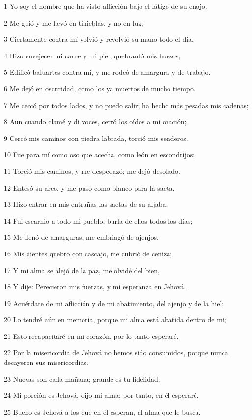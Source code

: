 \par 1 Yo soy el hombre que ha visto aflicción bajo el látigo de su enojo.
\par 2 Me guió y me llevó en tinieblas, y no en luz;
\par 3 Ciertamente contra mí volvió y revolvió su mano todo el día.
\par 4 Hizo envejecer mi carne y mi piel; quebrantó mis huesos;
\par 5 Edificó baluartes contra mí, y me rodeó de amargura y de trabajo.
\par 6 Me dejó en oscuridad, como los ya muertos de mucho tiempo.
\par 7 Me cercó por todos lados, y no puedo salir; ha hecho más pesadas mis cadenas;
\par 8 Aun cuando clamé y di voces, cerró los oídos a mi oración;
\par 9 Cercó mis caminos con piedra labrada, torció mis senderos.
\par 10 Fue para mí como oso que acecha, como león en escondrijos;
\par 11 Torció mis caminos, y me despedazó; me dejó desolado.
\par 12 Entesó su arco, y me puso como blanco para la saeta.
\par 13 Hizo entrar en mis entrañas las saetas de su aljaba.
\par 14 Fui escarnio a todo mi pueblo, burla de ellos todos los días;
\par 15 Me llenó de amarguras, me embriagó de ajenjos.
\par 16 Mis dientes quebró con cascajo, me cubrió de ceniza;
\par 17 Y mi alma se alejó de la paz, me olvidé del bien,
\par 18 Y dije: Perecieron mis fuerzas, y mi esperanza en Jehová.
\par 19 Acuérdate de mi aflicción y de mi abatimiento, del ajenjo y de la hiel;
\par 20 Lo tendré aún en memoria, porque mi alma está abatida dentro de mí;
\par 21 Esto recapacitaré en mi corazón, por lo tanto esperaré.
\par 22 Por la misericordia de Jehová no hemos sido consumidos, porque nunca decayeron sus misericordias. 
\par 23 Nuevas son cada mañana; grande es tu fidelidad.
\par 24 Mi porción es Jehová, dijo mi alma; por tanto, en él esperaré.
\par 25 Bueno es Jehová a los que en él esperan, al alma que le busca.
